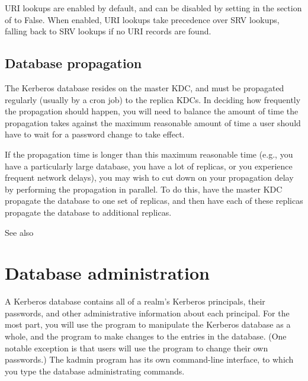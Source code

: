 \documentclass[letterpaper,10pt,english]{sphinxmanual}
\begin{document}
URI lookups are enabled by default, and can be disabled by setting
 in the {\hyperref[\detokenize{admin/conf_files/krb5_conf:libdefaults}]{}} section of
{\hyperref[\detokenize{admin/conf_files/krb5_conf:krb5-conf-5}]{}} to False.  When enabled, URI lookups take
precedence over SRV lookups, falling back to SRV lookups if no URI
records are found.


\section{Database propagation}
\label{\detokenize{admin/realm_config:database-propagation}}\label{\detokenize{admin/realm_config:db-prop}}
The Kerberos database resides on the master KDC, and must be
propagated regularly (usually by a cron job) to the replica KDCs.  In
deciding how frequently the propagation should happen, you will need
to balance the amount of time the propagation takes against the
maximum reasonable amount of time a user should have to wait for a
password change to take effect.

If the propagation time is longer than this maximum reasonable time
(e.g., you have a particularly large database, you have a lot of
replicas, or you experience frequent network delays), you may wish to
cut down on your propagation delay by performing the propagation in
parallel.  To do this, have the master KDC propagate the database to
one set of replicas, and then have each of these replicas propagate
the database to additional replicas.

See also {\hyperref[\detokenize{admin/database:incr-db-prop}]{}}


\chapter{Database administration}
\label{\detokenize{admin/database::doc}}\label{\detokenize{admin/database:database-administration}}
A Kerberos database contains all of a realm’s Kerberos principals,
their passwords, and other administrative information about each
principal.  For the most part, you will use the {\hyperref[\detokenize{admin/admin_commands/kdb5_util:kdb5-util-8}]{}}
program to manipulate the Kerberos database as a whole, and the
{\hyperref[\detokenize{admin/admin_commands/kadmin_local:kadmin-1}]{}} program to make changes to the entries in the
database.  (One notable exception is that users will use the
 program to change their own passwords.)  The kadmin
program has its own command-line interface, to which you type the
database administrating commands.
\end{document}
